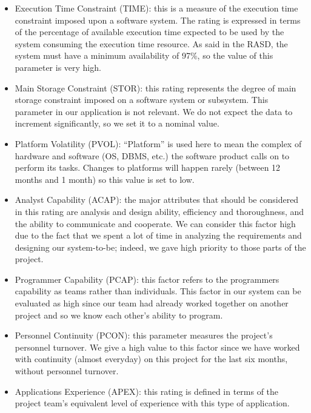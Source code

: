 \begin{itemize}
    \item Execution Time Constraint (TIME): this is a measure of the execution time constraint imposed upon a software system. The rating is expressed in terms of the percentage of available execution time expected to be used by the system consuming the execution time resource.
        \newline
        As said in the RASD, the system must have a minimum availability of 97\%, so the value of this parameter is very high. 
    \item Main Storage Constraint (STOR): this rating represents the degree of main storage constraint imposed on a software system or subsystem.
        \newline
        This parameter in our application is not relevant. We do not expect the data to increment significantly, so we set it to a nominal value.
    \item Platform Volatility (PVOL): “Platform” is used here to mean the complex of hardware and software (OS, DBMS, etc.) the software product calls on to perform its tasks.
        \newline
        Changes to platforms will happen rarely (between 12 months and 1 month) so this value is set to low.
    \item Analyst Capability (ACAP): the major attributes that should be considered in this rating are analysis and design ability, efficiency and thoroughness, and the ability to communicate and cooperate.
        \newline 
        We can consider this factor high due to the fact that we spent a lot of time in analyzing the requirements and designing our system-to-be; indeed, we gave high priority to those parts of the project. 
    \item Programmer Capability (PCAP): this factor refers to the programmers capability as teams rather than individuals.
        \newline 
        This factor in our system can be evaluated as high since our team had already worked together on another project and so we know each other's ability to program. 
    \item Personnel Continuity (PCON): this parameter measures the project’s personnel turnover. 
        \newline 
        We give a high value to this factor since we have worked with continuity (almost everyday) on this project for the last six months, without personnel turnover. 
    \item Applications Experience (APEX): this rating is defined in terms of the project team’s equivalent level of experience with this type of application.

\end{itemize}
